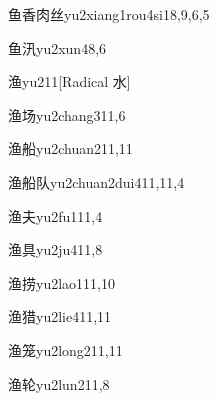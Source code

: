 \begin{entry}{鱼香肉丝}{yu2xiang1rou4si1}{8,9,6,5}
\end{entry}

\begin{entry}{鱼汛}{yu2xun4}{8,6}
\end{entry}

\begin{entry}{渔}{yu2}{11}[Radical 水]
\end{entry}

\begin{entry}{渔场}{yu2chang3}{11,6}
\end{entry}

\begin{entry}{渔船}{yu2chuan2}{11,11}
\end{entry}

\begin{entry}{渔船队}{yu2chuan2dui4}{11,11,4}
\end{entry}

\begin{entry}{渔夫}{yu2fu1}{11,4}
\end{entry}

\begin{entry}{渔具}{yu2ju4}{11,8}
\end{entry}

\begin{entry}{渔捞}{yu2lao1}{11,10}
\end{entry}

\begin{entry}{渔猎}{yu2lie4}{11,11}
\end{entry}

\begin{entry}{渔笼}{yu2long2}{11,11}
\end{entry}

\begin{entry}{渔轮}{yu2lun2}{11,8}
\end{entry}

